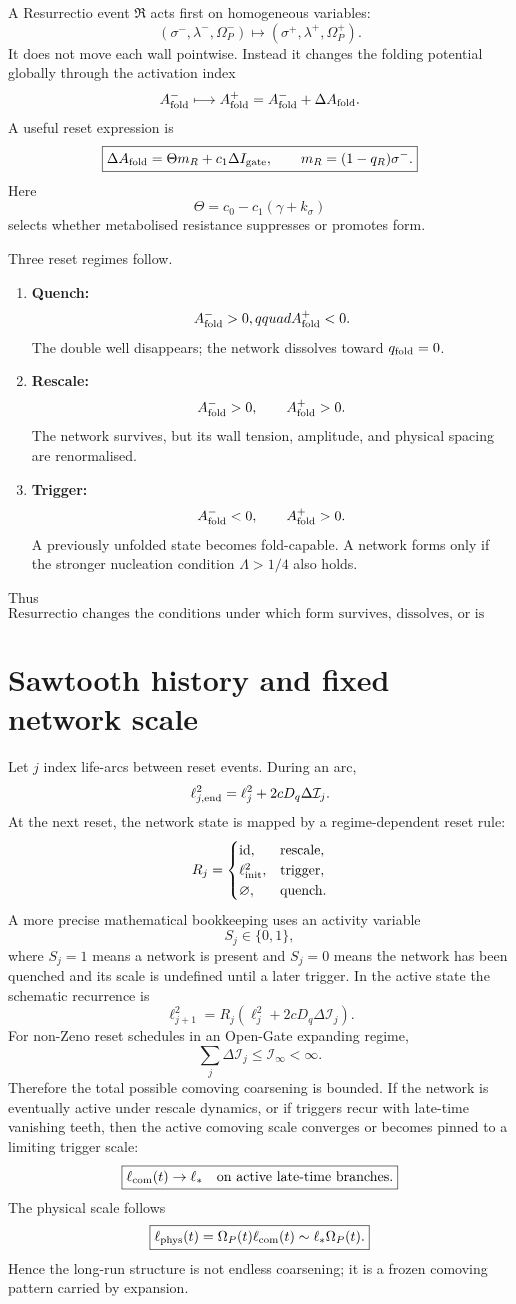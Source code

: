 \documentclass[11pt]{article}
\newcommand{\Op}{\Omega_P}
\newcommand{\qf}{q_{\rm fold}}
\newcommand{\Igate}{I_{\rm gate}}
\newcommand{\Af}{A_{\rm fold}}
\newcommand{\Dq}{D_q}
\newcommand{\Rreset}{\mathfrak R}
\newcommand{\ellcom}{\ell_{\rm com}}
\newcommand{\ellphys}{\ell_{\rm phys}}
\newcommand{\ellinit}{\ell_{\rm init}}
\newcommand{\Lam}{\Lambda}
\newcommand{\Iconf}{\mathcal I}
\theoremstyle{definition}
\theoremstyle{plain}
\begin{document}
A Resurrectio event $\Rreset$ acts first on homogeneous variables:
\[
(\sigma^-,\lambda^-,\Op^-)
\longmapsto
(\sigma^+,\lambda^+,\Op^+).
\]
It does not move each wall pointwise.  Instead it changes the folding potential globally through the activation
index
\[
\Af^-\longmapsto\Af^+=\Af^-+\Delta\Af.
\]
A useful reset expression is
\[
\boxed{
\Delta\Af=\Theta m_R+c_1\Delta\Igate,
\qquad
m_R=(1-q_R)\sigma^-.
}
\]
Here
\[
\boxed{
\Theta=c_0-c_1(\gamma+k_\sigma)
}
\]
selects whether metabolised resistance suppresses or promotes form.

Three reset regimes follow.
\begin{enumerate}
\item \textbf{Quench:}
\[
\Af^->0,\\qquad \Af^+<0.
\]
The double well disappears; the network dissolves toward $\qf=0$.

\item \textbf{Rescale:}
\[
\Af^->0,
\qquad \Af^+>0.
\]
The network survives, but its wall tension, amplitude, and physical spacing are renormalised.

\item \textbf{Trigger:}
\[
\Af^-<0,
\qquad \Af^+>0.
\]
A previously unfolded state becomes fold-capable.  A network forms only if the stronger nucleation condition
$\Lam>1/4$ also holds.
\end{enumerate}
Thus
\[
\boxed{\text{Resurrectio changes the conditions under which form survives, dissolves, or is born.}}
\]

\section{Sawtooth history and fixed network scale}

Let $j$ index life-arcs between reset events.  During an arc,
\[
\ell_{j,\rm end}^{2}
=
\ell_j^2+2c\Dq\Delta\Iconf_j.
\]
At the next reset, the network state is mapped by a regime-dependent reset rule:
\[
R_j=
\begin{cases}
\mathrm{id}, & \text{rescale},\\
\ellinit^2, & \text{trigger},\\
\varnothing, & \text{quench}.
\end{cases}
\]
A more precise mathematical bookkeeping uses an activity variable
\[
S_j\in\{0,1\},
\]
where $S_j=1$ means a network is present and $S_j=0$ means the network has been quenched and its scale is
undefined until a later trigger.  In the active state the schematic recurrence is
\[
\boxed{
\ell_{j+1}^{2}
=R_j\left(\ell_j^2+2c\Dq\Delta\Iconf_j\right).
}
\]
For non-Zeno reset schedules in an Open-Gate expanding regime,
\[
\sum_j\Delta\Iconf_j\le\Iconf_\infty<\infty.
\]
Therefore the total possible comoving coarsening is bounded.  If the network is eventually active under
rescale dynamics, or if triggers recur with late-time vanishing teeth, then the active comoving scale converges
or becomes pinned to a limiting trigger scale:
\[
\boxed{
\ellcom(t)\to\ell_\ast
\quad\text{on active late-time branches.}
}
\]
The physical scale follows
\[
\boxed{
\ellphys(t)=\Op(t)\ellcom(t)\sim \ell_\ast\Op(t).
}
\]
Hence the long-run structure is not endless coarsening; it is a frozen comoving pattern carried by expansion.
\end{document}

